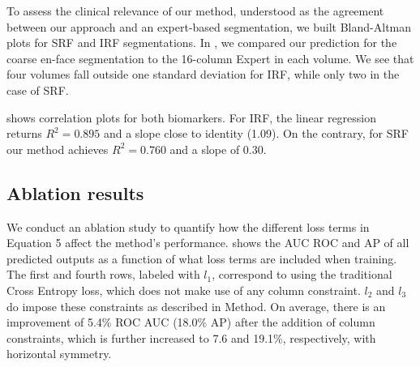 To assess the clinical relevance of our method, understood as the agreement between our approach and an expert-based segmentation, we built Bland-Altman plots for SRF and IRF segmentations. In , we compared our prediction for the coarse en-face segmentation to the 16-column Expert in each volume. We see that four volumes fall outside one standard deviation for IRF, while only two in the case of SRF.

 shows correlation plots for both biomarkers. For IRF, the linear regression returns $R^2=0.895$ and a slope close to identity (1.09). On the contrary, for SRF our method achieves $R^2=0.760$ and a slope of 0.30.





\subsection{Ablation results}
We conduct an ablation study to quantify how the different loss terms in Equation 5 affect the method's performance.  shows the AUC ROC and AP of all predicted outputs as a function of what loss terms are included when training. The first and fourth rows, labeled with $l_1$, correspond to using the traditional Cross Entropy loss, which does not make use of any column constraint. $l_2$ and $l_3$ do impose these constraints as described in Method. On average, there is an improvement of 5.4\% ROC AUC (18.0\% AP) after the addition of column constraints, which is further increased to 7.6 and 19.1\%, respectively, with horizontal symmetry.

